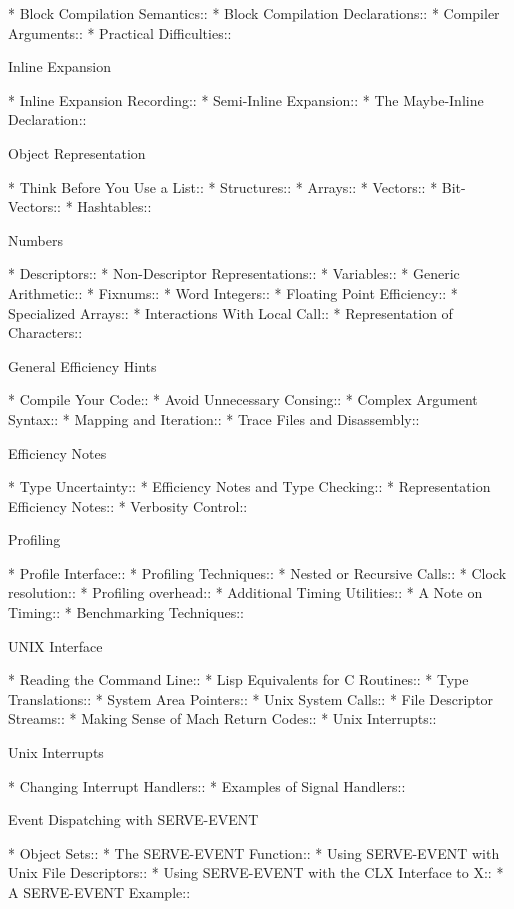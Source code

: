 \begin{menu}
* Block Compilation Semantics::  
* Block Compilation Declarations::  
* Compiler Arguments::          
* Practical Difficulties::      

Inline Expansion

* Inline Expansion Recording::  
* Semi-Inline Expansion::       
* The Maybe-Inline Declaration::  

Object Representation

* Think Before You Use a List::  
* Structures::                  
* Arrays::                      
* Vectors::                     
* Bit-Vectors::                 
* Hashtables::                  

Numbers

* Descriptors::                 
* Non-Descriptor Representations::  
* Variables::                   
* Generic Arithmetic::          
* Fixnums::                     
* Word Integers::               
* Floating Point Efficiency::   
* Specialized Arrays::          
* Interactions With Local Call::  
* Representation of Characters::  

General Efficiency Hints

* Compile Your Code::           
* Avoid Unnecessary Consing::   
* Complex Argument Syntax::     
* Mapping and Iteration::       
* Trace Files and Disassembly::  

Efficiency Notes

* Type Uncertainty::            
* Efficiency Notes and Type Checking::  
* Representation Efficiency Notes::  
* Verbosity Control::           

Profiling

* Profile Interface::           
* Profiling Techniques::        
* Nested or Recursive Calls::   
* Clock resolution::            
* Profiling overhead::          
* Additional Timing Utilities::  
* A Note on Timing::            
* Benchmarking Techniques::     

UNIX Interface

* Reading the Command Line::    
* Lisp Equivalents for C Routines::  
* Type Translations::           
* System Area Pointers::        
* Unix System Calls::           
* File Descriptor Streams::     
* Making Sense of Mach Return Codes::  
* Unix Interrupts::             

Unix Interrupts

* Changing Interrupt Handlers::  
* Examples of Signal Handlers::  

Event Dispatching with SERVE-EVENT

* Object Sets::                 
* The SERVE-EVENT Function::    
* Using SERVE-EVENT with Unix File Descriptors::  
* Using SERVE-EVENT with the CLX Interface to X::  
* A SERVE-EVENT Example::       


\end{menu}
